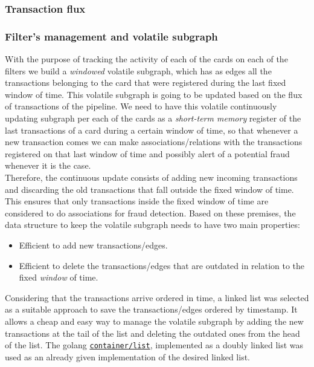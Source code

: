 \subsubsection{Transaction flux}

\subsubsection{Filter's management and volatile subgraph}


With the purpose of tracking the activity of each of the cards on each of the filters we build a \textit{windowed} volatile subgraph, which has as edges all the transactions belonging to the card that were registered during the last fixed window of time. This volatile subgraph is going to be updated based on the flux of transactions of the pipeline. We need to have this volatile continuously updating subgraph per each of the cards as a \textit{short-term memory} register of the last transactions of a card during a certain window of time, so that whenever a new transaction comes we can make associations/relations with the transactions registered on that last window of time and possibly alert of a potential fraud whenever it is the case.\\
Therefore, the continuous update consists of adding new incoming transactions and discarding the old transactions that fall outside the fixed window of time. This ensures that only transactions inside the fixed window of time are considered to do associations for fraud detection. 
Based on these premises, the data structure to keep the volatile subgraph needs to have two main properties:
\begin{itemize}
    \item Efficient to add new transactions/edges.
    \item Efficient to delete the transactions/edges that are outdated in relation to the fixed \textit{window} of time.
\end{itemize}

Considering that the transactions arrive ordered in time, a linked list was selected as a suitable approach to save the transactions/edges ordered by timestamp. It allows a cheap and easy way to manage the volatile subgraph by adding the new transactions at the tail of the list and deleting the outdated ones from the head of the list. The golang \href{https://pkg.go.dev/container/list}{\texttt{container/list}}, implemented as a doubly linked list was used as an already given implementation of the desired linked list.

